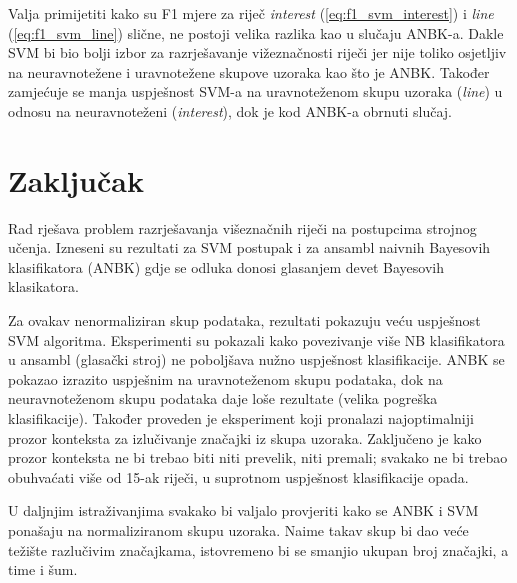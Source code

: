 \documentclass[10pt, a4paper]{article}
\begin{document}
Valja primijetiti kako su F1 mjere za riječ \emph{interest} (\ref{eq:f1_svm_interest}) i \emph{line} 
(\ref{eq:f1_svm_line}) slične, ne postoji velika razlika kao u slučaju ANBK-a.
Dakle SVM bi bio bolji izbor za razrješavanje vižeznačnosti riječi jer
nije toliko osjetljiv na neuravnotežene i uravnotežene skupove uzoraka
kao što je ANBK.
Također zamjećuje se manja uspješnost SVM-a na uravnoteženom
skupu uzoraka (\emph{line}) u odnosu na neuravnoteženi (\emph{interest}), 
dok je kod ANBK-a obrnuti slučaj.

\section{Zaključak}
Rad rješava problem razrješavanja višeznačnih riječi na postupcima
strojnog učenja. Izneseni su rezultati za SVM postupak i za
ansambl naivnih Bayesovih klasifikatora (ANBK) gdje se odluka donosi
glasanjem devet Bayesovih klasikatora.

Za ovakav nenormaliziran skup podataka, rezultati pokazuju
veću uspješnost SVM algoritma. Eksperimenti su pokazali kako povezivanje više 
NB klasifikatora u ansambl (glasački stroj) ne poboljšava nužno uspješnost klasifikacije.
ANBK se pokazao
izrazito uspješnim na uravnoteženom skupu podataka, dok
na neuravnoteženom skupu podataka daje loše rezultate (velika
pogreška klasifikacije).
Također proveden je eksperiment
koji pronalazi najoptimalniji prozor konteksta za izlučivanje
značajki iz skupa uzoraka. Zaključeno je kako prozor konteksta ne bi trebao
biti niti prevelik, niti premali; svakako ne bi trebao obuhvaćati više od 15-ak riječi, 
u suprotnom uspješnost klasifikacije opada.

U daljnjim istraživanjima svakako bi valjalo provjeriti kako se ANBK i SVM ponašaju na
normaliziranom skupu uzoraka. Naime takav skup bi dao veće težište razlučivim značajkama,
istovremeno bi se smanjio ukupan broj značajki, a time i šum.


 
\end{document}

